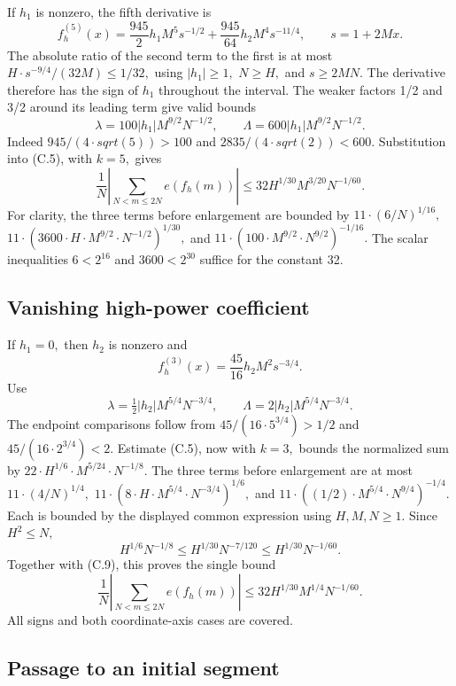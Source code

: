 \documentclass[11pt,a4paper]{article}
\begin{document}
If \(h_1\) is nonzero, the fifth derivative is \[
f_h^{(5)}(x)=\frac{945}{2}h_1M^5s^{-1/2}
             +\frac{945}{64}h_2M^4s^{-11/4},\qquad s=1+2Mx.
\] The absolute ratio of the second term to the first is at most
\(H\cdot s^{-9/4}/(32M)\le 1/32,\) using \(|h_1|\ge 1,\) \(N\ge H,\) and
\(s\ge 2MN.\) The derivative therefore has the sign of \(h_1\)
throughout the interval. The weaker factors 1/2 and 3/2 around its
leading term give valid bounds \[
\lambda=100|h_1|M^{9/2}N^{-1/2},\qquad
\Lambda=600|h_1|M^{9/2}N^{-1/2}. \tag{C.8}
\] Indeed \(945/(4\cdot sqrt(5))>100\) and
\(2835/(4\cdot sqrt(2))<600.\) Substitution into (C.5), with \(k=5,\)
gives \[
\frac1N\left|\sum_{N<m\le2N}e(f_h(m))\right|
\le32H^{1/30}M^{3/20}N^{-1/60}. \tag{C.9}
\] For clarity, the three terms before enlargement are bounded by
\(11\cdot (6/N)^{1/16},\)
\(11\cdot (3600\cdot H\cdot M^{9/2}\cdot N^{-1/2})^{1/30},\) and
\(11\cdot (100\cdot M^{9/2}\cdot N^{9/2})^{-1/16}.\) The scalar
inequalities \(6<2^16\) and \(3600<2^30\) suffice for the constant 32.

\subsection{Vanishing high-power
coefficient}\label{vanishing-high-power-coefficient}

If \(h_1=0,\) then \(h_2\) is nonzero and \[
f_h^{(3)}(x)=\frac{45}{16}h_2M^2s^{-3/4}.
\] Use \[
\lambda=\tfrac12|h_2|M^{5/4}N^{-3/4},\qquad
\Lambda=2|h_2|M^{5/4}N^{-3/4}.
\] The endpoint comparisons follow from \(45/(16\cdot 5^{3/4})>1/2\) and
\(45/(16\cdot 2^{3/4})<2.\) Estimate (C.5), now with \(k=3,\) bounds the
normalized sum by \(22\cdot H^{1/6}\cdot M^{5/24}\cdot N^{-1/8}.\) The
three terms before enlargement are at most \(11\cdot (4/N)^{1/4},\)
\(11\cdot (8\cdot H\cdot M^{5/4}\cdot N^{-3/4})^{1/6},\) and
\(11\cdot ((1/2)\cdot M^{5/4}\cdot N^{9/4})^{-1/4}.\) Each is bounded by
the displayed common expression using \(H,M,N\ge 1.\) Since
\(H^2\le N,\) \[
H^{1/6}N^{-1/8}
\le H^{1/30}N^{-7/120}
\le H^{1/30}N^{-1/60}.
\] Together with (C.9), this proves the single bound \[
\frac1N\left|\sum_{N<m\le2N}e(f_h(m))\right|
\le32H^{1/30}M^{1/4}N^{-1/60}. \tag{C.10}
\] All signs and both coordinate-axis cases are covered.

\subsection{Passage to an initial
segment}\label{passage-to-an-initial-segment}
\end{document}
